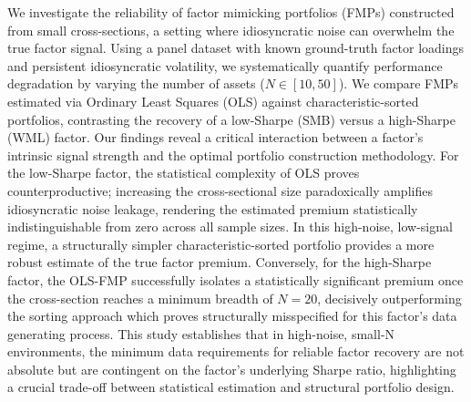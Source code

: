\documentclass[]{article}
\begin{document}
We investigate the reliability of factor mimicking portfolios (FMPs) constructed from small cross-sections, a setting where idiosyncratic noise can overwhelm the true factor signal. Using a panel dataset with known ground-truth factor loadings and persistent idiosyncratic volatility, we systematically quantify performance degradation by varying the number of assets ($N \in [10, 50]$). We compare FMPs estimated via Ordinary Least Squares (OLS) against characteristic-sorted portfolios, contrasting the recovery of a low-Sharpe (SMB) versus a high-Sharpe (WML) factor. Our findings reveal a critical interaction between a factor's intrinsic signal strength and the optimal portfolio construction methodology. For the low-Sharpe factor, the statistical complexity of OLS proves counterproductive; increasing the cross-sectional size paradoxically amplifies idiosyncratic noise leakage, rendering the estimated premium statistically indistinguishable from zero across all sample sizes. In this high-noise, low-signal regime, a structurally simpler characteristic-sorted portfolio provides a more robust estimate of the true factor premium. Conversely, for the high-Sharpe factor, the OLS-FMP successfully isolates a statistically significant premium once the cross-section reaches a minimum breadth of $N=20$, decisively outperforming the sorting approach which proves structurally misspecified for this factor's data generating process. This study establishes that in high-noise, small-N environments, the minimum data requirements for reliable factor recovery are not absolute but are contingent on the factor's underlying Sharpe ratio, highlighting a crucial trade-off between statistical estimation and structural portfolio design.
\end{document}
